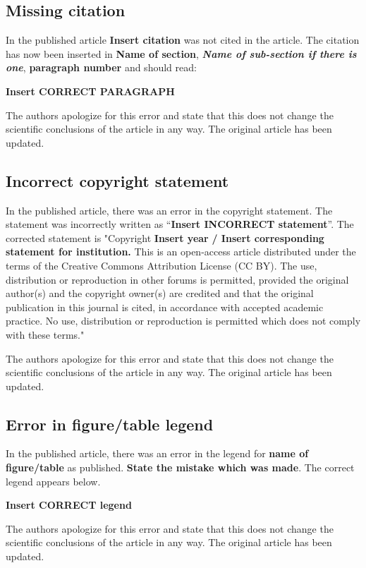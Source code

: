 \documentclass[utf8]{frontiers_correction}
\begin{document}
\vspace{5mm}
\subsection*{Missing citation}
In the published article \textbf{Insert citation} was not cited in the article. The citation has now been inserted in \textbf{Name of section}, \textbf{\textit{Name of sub-section if there is one}}, \textbf{paragraph number} and should read:\par
\textbf{Insert CORRECT PARAGRAPH}\par
The authors apologize for this error and state that this does not change the scientific conclusions of the article in any way. The original article has been updated.


\vspace{5mm}
\subsection*{Incorrect copyright statement}
In the published article, there was an error in the copyright statement. The statement was incorrectly written as “\textbf{Insert INCORRECT statement}”. The corrected statement is "Copyright \textcopyright \textbf{ Insert year} \textbf{/ Insert corresponding statement for institution.} This is an open-access article distributed under the terms of the Creative Commons Attribution License (CC BY). The use, distribution or reproduction in other forums is permitted, provided the original author(s) and the copyright owner(s) are credited and that the original publication in this journal is cited, in accordance with accepted academic practice. No use, distribution or reproduction is permitted which does not comply with these terms."\par
The authors apologize for this error and state that this does not change the scientific conclusions of the article in any way. The original article has been updated.


\vspace{5mm}
\subsection*{Error in figure/table legend}
In the published article, there was an error in the legend for \textbf{name of figure/table} as published. \textbf{State the mistake which was made}. The correct legend appears below.\par
\textbf{Insert CORRECT legend}\par
The authors apologize for this error and state that this does not change the scientific conclusions of the article in any way. The original article has been updated.
\end{document}
